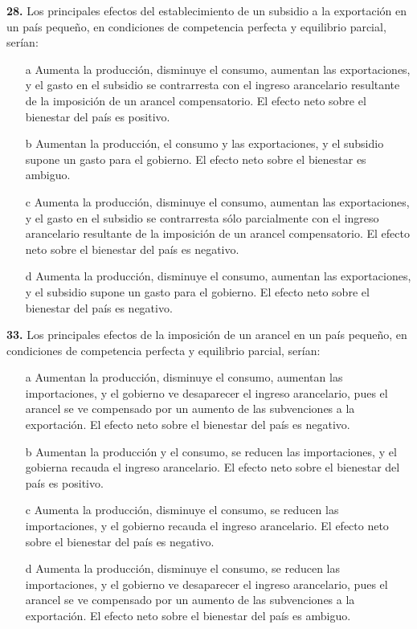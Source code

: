 \documentclass{nuevotema}
\begin{document}

\textbf{28.} Los principales efectos del establecimiento de un subsidio a la exportación en un país pequeño, en condiciones de competencia perfecta y equilibrio parcial, serían:

\begin{itemize}
	\item[a] Aumenta la producción, disminuye el consumo, aumentan las exportaciones, y el gasto en el subsidio se contrarresta con el ingreso arancelario resultante de la imposición de un arancel compensatorio. El efecto neto sobre el bienestar del país es positivo.
	\item[b] Aumentan la producción, el consumo y las exportaciones, y el subsidio supone un gasto para el gobierno. El efecto neto sobre el bienestar es ambiguo.
	\item[c] Aumenta la producción, disminuye el consumo, aumentan las exportaciones, y el gasto en el subsidio se contrarresta sólo parcialmente con el ingreso arancelario resultante de la imposición de un arancel compensatorio. El efecto neto sobre el bienestar del país es negativo.
	\item[d] Aumenta la producción, disminuye el consumo, aumentan las exportaciones, y el subsidio supone un gasto para el gobierno. El efecto neto sobre el bienestar del país es negativo.
\end{itemize}


\textbf{33.} Los principales efectos de la imposición de un arancel en un país pequeño, en condiciones de competencia perfecta y equilibrio parcial, serían:

\begin{itemize}
	\item[a] Aumentan la producción, disminuye el consumo, aumentan las importaciones, y el gobierno ve desaparecer el ingreso arancelario, pues el arancel se ve compensado por un aumento de las subvenciones a la exportación. El efecto neto sobre el bienestar del país es negativo.
	\item[b] Aumentan la producción y el consumo, se reducen las importaciones, y el gobierna recauda el ingreso arancelario. El efecto neto sobre el bienestar del país es positivo.
	\item[c] Aumenta la producción, disminuye el consumo, se reducen las importaciones, y el gobierno recauda el ingreso arancelario. El efecto neto sobre el bienestar del país es negativo.
	\item[d] Aumenta la producción, disminuye el consumo, se reducen las importaciones, y el gobierno ve desaparecer el ingreso arancelario, pues el arancel se ve compensado por un aumento de las subvenciones a la exportación. El efecto neto sobre el bienestar del país es ambiguo.
\end{itemize}
\end{document}
